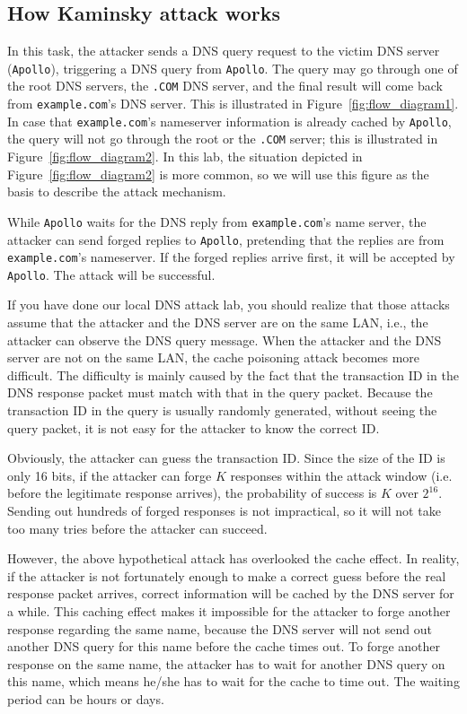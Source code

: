 \subsection{How Kaminsky attack works}

In this task, the attacker sends a DNS query request to the victim
DNS server ({\tt Apollo}), triggering a DNS query from {\tt Apollo}. The
query may go through one of the root DNS servers, the {\tt .COM} DNS server, and 
the final result will come back from {\tt example.com}'s DNS server. This 
is illustrated in Figure~\ref{fig:flow_diagram1}. In case that 
{\tt example.com}'s nameserver information is already cached by 
{\tt Apollo}, the query will not go through the root or the 
{\tt .COM} server; this is illustrated in Figure~\ref{fig:flow_diagram2}.
In this lab, the situation depicted in  Figure~\ref{fig:flow_diagram2} is 
more common, so we will use this figure as the basis to describe 
the attack mechanism.

While {\tt Apollo} waits for the DNS reply from {\tt example.com}'s name
server, the attacker can send forged replies to {\tt Apollo}, pretending 
that the replies are from {\tt example.com}'s nameserver. If the forged 
replies arrive first, it will be accepted by {\tt Apollo}. The attack will
be successful.


If you have done our local DNS attack lab, you should realize that 
those attacks assume that the attacker and the DNS server are on
the same LAN, i.e., the attacker can observe the DNS query message. 
When the attacker and the DNS server are not on the same LAN,
the cache poisoning attack becomes more difficult.
The difficulty is mainly caused by the fact that the transaction ID
in the DNS response packet must match with that 
in the query packet. Because the transaction ID in the query is 
usually randomly generated, without seeing the query packet,
it is not easy for the attacker to know the correct ID.


Obviously, the attacker can guess the transaction ID. Since the
size of the ID is only 16 bits, if the attacker can forge $K$ 
responses within the attack window (i.e. before the legitimate
response arrives), the probability of success is $K$ over $2^{16}$.
Sending out hundreds of forged responses is not impractical, so
it will not take too many tries before the attacker can succeed. 


However, the above hypothetical attack has overlooked the cache effect.
In reality, if the attacker is not fortunately enough to make a correct guess before
the real response packet arrives, correct information will be cached 
by the DNS server for a while. This caching effect makes it impossible
for the attacker to forge another response regarding the same 
name, because the DNS server will not send out another DNS query for 
this name before the cache times out.
To forge another response on the same name, the attacker has to 
wait for another DNS query on this name, which means he/she has to
wait for the cache to time out. The waiting period can be hours or days.


